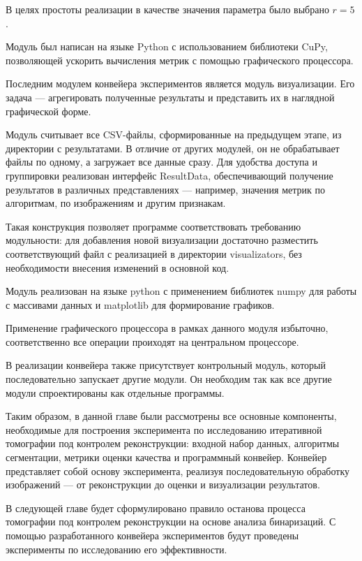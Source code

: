 В целях простоты реализации в качестве значения параметра было выбрано \(r = 5\). 

Модуль был написан на языке Python с использованием библиотеки CuPy, позволяющей ускорить вычисления метрик с помощью графического процессора.

Последним модулем конвейера экспериментов является модуль визуализации. Его задача — агрегировать полученные результаты и представить их в наглядной графической форме.

Модуль считывает все CSV-файлы, сформированные на предыдущем этапе, из директории с результатами. В отличие от других модулей, он не обрабатывает файлы по одному, а загружает все данные сразу. Для удобства доступа и группировки реализован интерфейс ResultData, обеспечивающий получение результатов в различных представлениях — например, значения метрик по алгоритмам, по изображениям и другим признакам.

Такая конструкция позволяет программе соответствовать требованию модульности: для добавления новой визуализации достаточно разместить соответствующий файл с реализацией в директории visualizators, без необходимости внесения изменений в основной код.

Модуль реализован на языке python с применением библиотек numpy для работы с массивами данных и matplotlib для формирование графиков.

Применение графического процессора в рамках данного модуля избыточно, соответственно все операции проиходят на центральном процессоре.

В реализации конвейера также присутствует контрольный модуль, который последовательно запускает другие модули. Он необходим так как все другие модули спроектированы как отдельные программы.

Таким образом, в данной главе были рассмотрены все основные компоненты, необходимые для построения эксперимента по исследованию итеративной томографии под контролем реконструкции: входной набор данных, алгоритмы сегментации, метрики оценки качества и программный конвейер. Конвейер представляет собой основу эксперимента, реализуя последовательную обработку изображений — от реконструкции до оценки и визуализации результатов. 

В следующей главе будет сформулировано правило останова процесса томографии под контролем реконструкции на основе анализа бинаризаций. С помощью разработанного конвейера экспериментов будут проведены эксперименты по исследованию его эффективности.